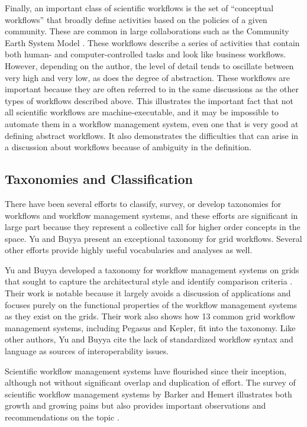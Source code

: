 Finally, an important class of scientific workflows is the set of ``conceptual
workflows'' that broadly define activities based on the policies of a given
community. These are common in large collaborations such as the Community Earth
System Model \cite{noauthor_cesm_nodate}. These workflows describe a
series of activities that contain both human- and computer-controlled tasks
and look like business workflows. However, depending on the author, the level of detail tends to
oscillate between very high and very low, as does the degree of abstraction. These workflows are important because they are often
referred to in the same discussions as the other types of workflows described
above. This illustrates the important fact that not all scientific workflows are
machine-executable, and it may be impossible to automate them in a workflow
management system, even one that is very good at defining abstract workflows. It
also demonstrates the difficulties that can arise in a discussion about workflows
because of ambiguity in the definition.

\subsection{Taxonomies and Classification}\label{taxonomies-and-classification}
There have been several efforts to classify, survey, or develop taxonomies for
workflows and workflow management systems, and these efforts are significant in
large part because they represent a collective call for higher order concepts in
the space. Yu and Buyya present an exceptional taxonomy for grid
workflows. Several other efforts provide highly useful vocabularies and
analyses as well.

Yu and Buyya developed a taxonomy for workflow management systems on grids that
sought to capture the architectural style and identify comparison criteria
\cite{yu_taxonomy_2005}. Their work is notable because it largely avoids a
discussion of applications and focuses purely on the functional properties of
the workflow management systems as they exist on the grids. Their work also
shows how 13 common grid workflow management systems, including Pegasus
and Kepler, fit into the taxonomy. Like other authors, Yu and Buyya cite
the lack of standardized workflow syntax and language as sources of
interoperability issues.

Scientific workflow management systems have flourished since their inception,
although not without significant overlap and duplication of effort. The survey
of scientific workflow management systems by Barker and Hemert illustrates both
growth and growing pains but also provides important observations and
recommendations on the topic \cite{barker_scientific_2007}.

